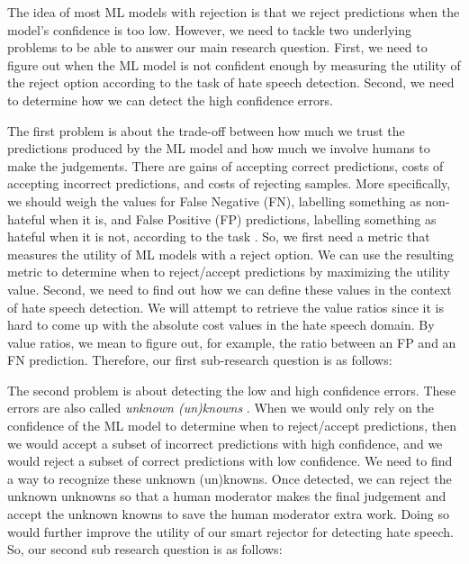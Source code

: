 
The idea of most ML models with rejection is that we reject predictions when the model's confidence is too low. However, we need to tackle two underlying problems to be able to answer our main research question. First, we need to figure out when the ML model is not confident enough by measuring the utility of the reject option according to the task of hate speech detection. Second, we need to determine how we can detect the high confidence errors.

The first problem is about the trade-off between how much we trust the predictions produced by the ML model and how much we involve humans to make the judgements. There are gains of accepting correct predictions, costs of accepting incorrect predictions, and costs of rejecting samples. More specifically, we should weigh the values for False Negative (FN), labelling something as non-hateful when it is, and False Positive (FP) predictions, labelling something as hateful when it is not, according to the task \cite{sayin2021science}. So, we first need a metric that measures the utility of ML models with a reject option. We can use the resulting metric to determine when to reject/accept predictions by maximizing the utility value. Second, we need to find out how we can define these values in the context of hate speech detection. We will attempt to retrieve the value ratios since it is hard to come up with the absolute cost values in the hate speech domain. By value ratios, we mean to figure out, for example, the ratio between an FP and an FN prediction. Therefore, our first sub-research question is as follows:


The second problem is about detecting the low and high confidence errors. These errors are also called \textit{unknown (un)knowns} \cite{liu2020towards}. When we would only rely on the confidence of the ML model to determine when to reject/accept predictions, then we would accept a subset of incorrect predictions with high confidence, and we would reject a subset of correct predictions with low confidence. We need to find a way to recognize these unknown (un)knowns. Once detected, we can reject the unknown unknowns so that a human moderator makes the final judgement and accept the unknown knowns to save the human moderator extra work. Doing so would further improve the utility of our smart rejector for detecting hate speech. So, our second sub research question is as follows:

